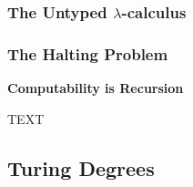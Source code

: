 \subsubsection{The Untyped $\lambda$-calculus}

\subsubsection{The Halting Problem}









\begin{tcolorbox}[breakable, enhanced, colback=textbook-blue, sharp corners]
	\vspace{3mm}
	
	\begin{center}
		\textbf{Computability is Recursion}
	\end{center}
	TEXT
	
	\vspace{3mm}
\end{tcolorbox}
\vspace{2\baselineskip}


\subsection{Turing Degrees}



